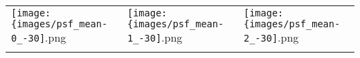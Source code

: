  \begin{tabular}{lll}
\texttt{[image: \{images/psf\_mean-0\_-30]}.png} &\texttt{[image: \{images/psf\_mean-1\_-30]}.png} &\texttt{[image: \{images/psf\_mean-2\_-30]}.png} 
 \\ \hfill\end{tabular}